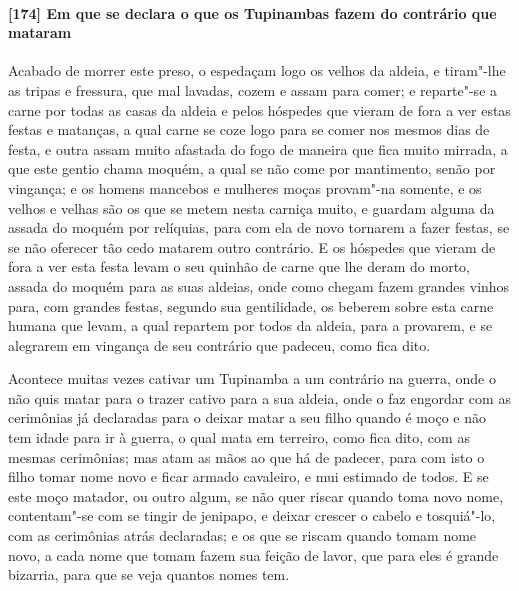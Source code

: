 \begin{linenumbers}
\paragraph{[174] Em que se declara o que os Tupinambas fazem do contrário que mataram}\quad
Acabado de morrer este preso, o espedaçam logo os velhos da aldeia, e tiram"-lhe as tripas
e fressura, que mal lavadas, cozem e assam para comer; e reparte"-se a carne por todas as
casas da aldeia e pelos hóspedes que vieram de fora a ver estas festas e matanças, a qual
carne se coze logo para se comer nos mesmos dias de festa, e outra assam muito afastada do
fogo de maneira que fica muito mirrada, a que este gentio chama moquém, a qual se não come
por mantimento, senão por vingança; e os homens mancebos e mulheres moças provam"-na
somente, e os velhos e velhas são os que se metem nesta carniça muito, e guardam alguma da
assada do moquém por relíquias, para com ela de novo tornarem a fazer festas, se se não
oferecer tão cedo matarem outro contrário. E os hóspedes que vieram de fora a ver esta
festa levam o seu quinhão de carne que lhe deram do morto, assada do moquém para as suas
aldeias, onde como chegam fazem grandes vinhos para, com grandes festas, segundo sua
gentilidade, os beberem sobre esta carne humana que levam, a qual repartem por todos da
aldeia, para a provarem, e se alegrarem em vingança de seu contrário que padeceu, como
fica dito.

Acontece muitas vezes cativar um Tupinamba a um contrário na guerra, onde o não quis matar
para o trazer cativo para a sua aldeia, onde o faz engordar com as cerimônias já
declaradas para o deixar matar a seu filho quando é moço e não tem idade para ir à guerra,
o qual mata em terreiro, como fica dito, com as mesmas cerimônias; mas atam as mãos ao que
há de padecer, para com isto o filho tomar nome novo e ficar armado cavaleiro, e mui
estimado de todos. E se este moço matador, ou outro algum, se não quer riscar quando toma
novo nome, contentam"-se com se tingir de jenipapo, e deixar crescer o cabelo e tosquiá"-lo,
com as cerimônias atrás declaradas; e os que se riscam quando tomam nome novo, a cada nome
que tomam fazem sua feição de lavor, que para eles é grande bizarria, para que se veja
quantos nomes tem.


\end{linenumbers}
